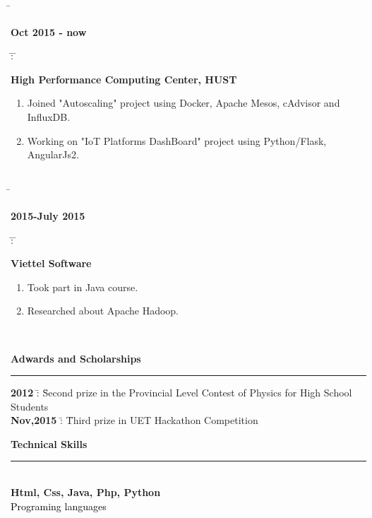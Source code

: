 \documentclass[a4paper,12pt]{article}
\begin{document}
\begin{tabbing}

\=

\begin{minipage}{0.25\textwidth} \textbf{Oct 2015 - now} \end{minipage}\= : \= 
\begin{minipage}{0.75\textwidth}
\textbf{High Performance Computing Center, HUST}
\begin{enumerate}
\item Joined "Autoscaling" project using Docker, Apache Mesos, cAdvisor and InfluxDB.
\item Working on "IoT Platforms DashBoard" project using Python/Flask, AngularJs2.\\
\end{enumerate}
\end{minipage}
\\
\= 
\begin{minipage}{0.25\textwidth} \textbf{2015-July 2015} \end{minipage} \= : \= 
\begin{minipage}{0.75\textwidth}
\textbf{Viettel Software}
\begin{enumerate}
\item Took part in Java course. 
\item Researched about Apache Hadoop.
\end{enumerate}
\end{minipage}\\

\end{tabbing}

\textbf{\Large Adwards and Scholarships \\}
\makebox[0pt][1]{\large\bf }\ignorespaces%
{\rule[-1mm]{\linewidth}{.5mm}}

\begin{tabbing}
\= \textbf{2012} \= : \= Second prize in the Provincial Level Contest of Physics for High School Students \\[0.4cm]
\= \textbf{Nov,2015} \= : \= Third prize in UET Hackathon Competition\\
\end{tabbing}




\textbf{\Large Technical Skills \\}
\makebox[0pt][1]{\large\bf }\ignorespaces%
{\rule[-1mm]{\linewidth}{.5mm}}
\\[0.6cm]
\textbf{Html, Css, Java, Php, Python}\\
\hspace*{60pt}\textcolor{black}{Programing languages}\\
\end{document}
